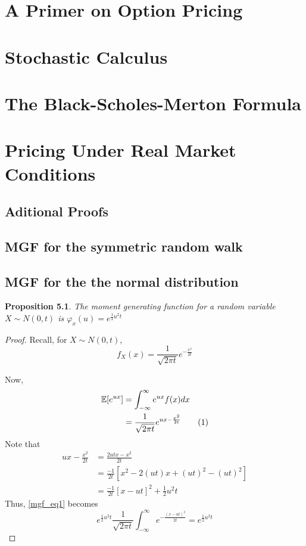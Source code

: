 \documentclass[11pt]{report}
\newtheorem{proposition}{Proposition}[chapter]
\newcommand\numberthis{\addtocounter{equation}{1}\tag{\theequation}}
\begin{document}
\chapter{A Primer on Option Pricing}
\chapter{Stochastic Calculus}
\chapter{The Black-Scholes-Merton Formula}
\chapter{Pricing Under Real Market Conditions}

\begin{appendices}
\makeatletter
{}
\makeatother
  \chapter{Aditional Proofs}
  \section{MGF for the symmetric random walk} \label{mgf_srm}
  \section{MGF for the the normal distribution} \label{mgf_nd}
  \begin{proposition}
  	The moment generating function for a random variable $X \sim N(0, t)$ is $\varphi_x(u) = e^{\frac{1}{2}u^2t}$
  \end{proposition}
  
  \begin{proof}
  	Recall, for $X \sim N(0, t)$,
  	\[f_X(x) = \frac{1}{\sqrt{2\pi t}}e^{-\frac{x^2}{2t}} \]  	
  	
  	Now, 
  	\begin{align*}
  		\mathbb{E}[e^{ux}] &= \int_{-\infty}^{\infty} e^{ux} f(x) dx \\
  		&= \frac{1}{\sqrt{2\pi t}}e^{ux - \frac{x^2}{2t}} \numberthis \label{mgf_eq1} \\
  	\end{align*}
  	Note that
  	\begin{align*}
  		ux - \frac{x^2}{2t} &= \frac{2utx - x^2}{2t}\\
  		&= \frac{-1}{2t}\left[x^2 -2(ut)x + (ut)^2 - (ut)^2\right]\\
  		&= \frac{-1}{2t}\left[x - ut\right]^2 + \frac{1}{2}u^2t
  	\end{align*}
  	Thus, \ref{mgf_eq1} becomes
  	\begin{equation}
  		e^{\frac{1}{2}u^2t} \frac{1}{\sqrt{2\pi t}}\int_{-\infty}^{\infty}e^{-\frac{\left(x - ut\right)^2}{2t}} = e^{\frac{1}{2}u^2t}
  	\end{equation}
  \end{proof}

\end{appendices}
\end{document}

